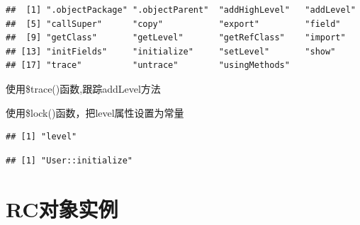 \documentclass[]{book}
\newenvironment{Shaded}{\begin{snugshade}}{\end{snugshade}}
\newcommand{\KeywordTok}[1]{\textcolor[rgb]{0.13,0.29,0.53}{\textbf{#1}}}
\newcommand{\StringTok}[1]{\textcolor[rgb]{0.31,0.60,0.02}{#1}}
\newcommand{\CommentTok}[1]{\textcolor[rgb]{0.56,0.35,0.01}{\textit{#1}}}
\newcommand{\OperatorTok}[1]{\textcolor[rgb]{0.81,0.36,0.00}{\textbf{#1}}}
\newcommand{\NormalTok}[1]{#1}
\begin{document}
\begin{verbatim}
##  [1] ".objectPackage" ".objectParent"  "addHighLevel"   "addLevel"      
##  [5] "callSuper"      "copy"           "export"         "field"         
##  [9] "getClass"       "getLevel"       "getRefClass"    "import"        
## [13] "initFields"     "initialize"     "setLevel"       "show"          
## [17] "trace"          "untrace"        "usingMethods"
\end{verbatim}

使用\$trace()函数,跟踪addLevel方法

使用\$lock()函数，把level属性设置为常量

\begin{Shaded}
\end{Shaded}

\begin{verbatim}
## [1] "level"
\end{verbatim}

\begin{Shaded}
\end{Shaded}

\begin{verbatim}
## [1] "User::initialize"
\end{verbatim}

\begin{Shaded}
\end{Shaded}

\section{RC对象实例}\label{rc}
\end{document}

